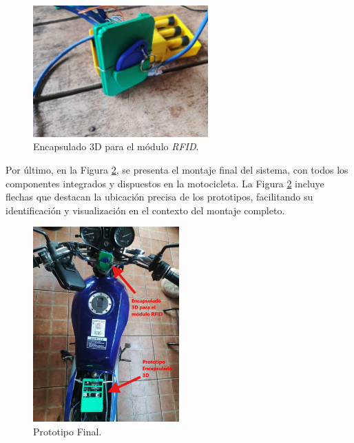 \begin{figure}[H]
\leavevmode
\begin{minipage}{\textwidth}
\begin{center}
\includegraphics[width=0.6\textwidth]{./capitulo_05/imagen/caserfid.jpg}
\caption{Encapsulado 3D para el módulo \textit{RFID}.\label{fig:caserfid}}
\end{center}
\end{minipage}
\end{figure}

Por último, en la Figura \ref{fig:motocompleto}, se presenta el montaje final del sistema, con todos los componentes integrados y dispuestos en la motocicleta. La Figura \ref{fig:motocompleto} incluye flechas que destacan la ubicación precisa de los prototipos, facilitando su identificación y visualización en el contexto del montaje completo.

\begin{figure}[H]
\leavevmode
\begin{minipage}{\textwidth}
\begin{center}
\includegraphics[width=0.5\textwidth]{./capitulo_05/imagen/prototipofinalmontado.jpg}
\caption{Prototipo Final.\label{fig:motocompleto}}
\end{center}
\end{minipage}
\end{figure}

